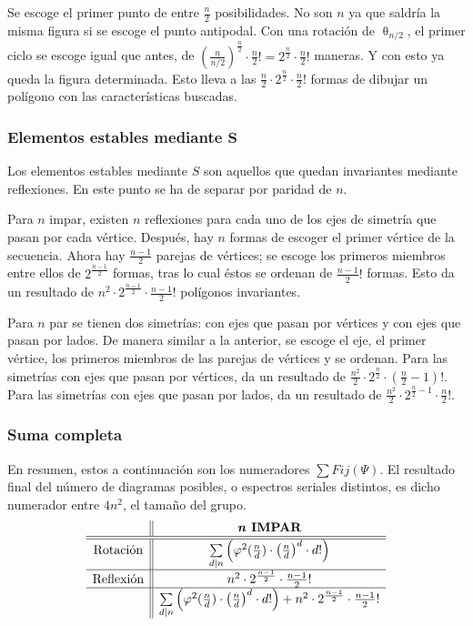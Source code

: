 		Se escoge el primer punto de entre $\frac{n}{2}$ posibilidades. No son $n$ ya que saldr\'ia la misma figura si se escoge el punto antipodal.
		Con una rotaci\'on de $\uptheta_{{n}/{2}}$, el primer ciclo se escoge igual que antes, de $\left(\frac{n}{n/2}\right)^{\frac{n}{2}}\cdot \frac{n}{2}!=2^{\frac{n}{2}}\cdot \frac{n}{2}!$ maneras. Y con esto ya queda la figura determinada. Esto lleva a las $\frac{n}{2}\cdot2^{\frac{n}{2}}\cdot\frac{n}{2}!$ formas de dibujar un pol\'igono con las caracter\'isticas buscadas.
		
		\subsubsection[Elementos estables mediante $S$]{Elementos estables mediante $\bm{S}$}
		
		Los elementos estables mediante $S$ son aquellos que quedan invariantes mediante reflexiones. En este punto se ha de separar por paridad de $n$. 
		
		Para $n$ impar, existen $n$ reflexiones para cada uno de los ejes de simetr\'ia que pasan por cada v\'ertice. Despu\'es, hay $n$ formas de escoger el primer v\'ertice de la secuencia. Ahora hay $\frac{n-1}{2}$ parejas de v\'ertices; se escoge los primeros miembros entre ellos de $2^{\frac{n-1}{2}}$ formas, tras lo cual \'estos se ordenan de $\frac{n-1}{2}!$ formas. Esto da un resultado de  $n^2\cdot2^{\frac{n-1}{2}}\cdot\frac{n-1}{2}!$ pol\'igonos invariantes.
		
		Para $n$ par se tienen dos simetr\'ias: con ejes que pasan por v\'ertices y con ejes que pasan por lados. De manera similar a la anterior, se escoge el eje, el primer v\'ertice, los primeros miembros de las parejas de v\'ertices y se ordenan. Para las simetr\'ias con ejes que pasan por v\'ertices, da un resultado de  $\frac{n^2}{2}\cdot2^{\frac{n}{2}}\cdot\left(\frac{n}{2}-1\right)!$. Para las simetr\'ias con ejes que pasan por lados, da un resultado de $\frac{n^2}{2}\cdot2^{\frac{n}{2}-1}\cdot\frac{n}{2}!$.
		
		\subsubsection*{Suma completa}
		
		En resumen, estos a continuaci\'on son los numeradores $\sum%
		{Fij}(\Psi)$. El resultado final del n\'umero de diagramas posibles, o espectros seriales distintos, es dicho numerador entre $4n^2$, el tama\~no del grupo. 	
		\def\arraystretch{1.5}
		\[\begin{array}{c||c}
		&\textbf{\textit{n} IMPAR}\\\hline\hline
		\mbox{Rotaci\'on}&\sum\limits_{d|n}\left(\varphi^2(\frac{n}{d})\cdot\left(\frac{n}{d}\right)^d\cdot d!\right)\\\hline
		\mbox{Reflexi\'on}&n^2\cdot2^{\frac{n-1}{2}}\cdot\frac{n-1}{2}!\\\hline
		&\sum\limits_{d|n}\left(\varphi^2(\frac{n}{d})\cdot\left(\frac{n}{d}\right)^d\cdot d!\right)+n^2\cdot2^{\frac{n-1}{2}}\cdot\frac{n-1}{2}!\\
		\end{array}\]
		
